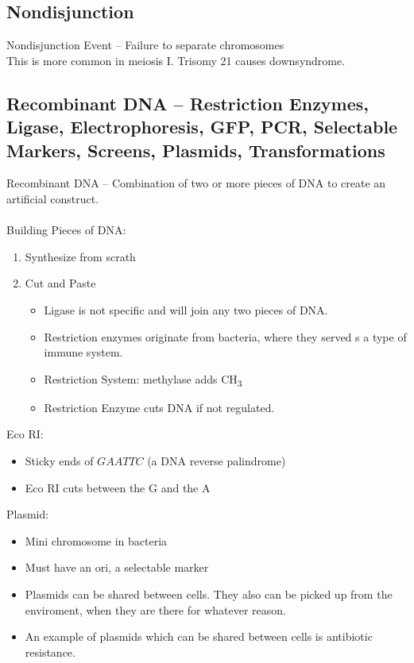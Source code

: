 \documentclass{article}
\begin{document}
\subsection{Nondisjunction}

Nondisjunction Event -- Failure to separate chromosomes\\
This is more common in meiosis I. Trisomy 21 causes downsyndrome.

\subsection{Recombinant DNA -- Restriction Enzymes, Ligase, Electrophoresis, GFP, PCR, Selectable Markers, Screens, Plasmids, Transformations}
Recombinant DNA -- Combination of two or more pieces of DNA to create an artificial construct.\\
\\
Building Pieces of DNA:
\begin{enumerate}
\item Synthesize from scrath
\item Cut and Paste
\begin{itemize}
\item Ligase is not specific and will join any two pieces of DNA.
\item Restriction enzymes originate from bacteria, where they served s a type of immune system.
\item Restriction System: methylase adds CH\textsubscript{3}
\item Restriction Enzyme cuts DNA if not regulated.
\end{itemize}
\end{enumerate}

Eco RI:
\begin{itemize}
\item Sticky ends of $GAATTC$ (a DNA reverse palindrome)
\item Eco RI cuts between the G and the A
\end{itemize}

Plasmid:
\begin{itemize}
\item Mini chromosome in bacteria
\item Must have an ori, a selectable marker
\item Plasmids can be shared between cells. They also can be picked up from the enviroment, when they are there for whatever reason.
\item An example of plasmids which can be shared between cells is antibiotic resistance.
\end{itemize}
\end{document}
